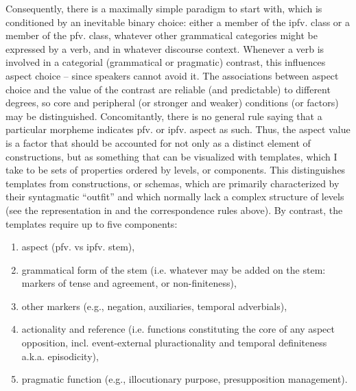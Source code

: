 \documentclass[output=paper]{langscibook}
\begin{document}
Consequently, there is a maximally simple paradigm to start with, which is conditioned by an inevitable binary choice: either a member of the ipfv. class or a member of the pfv. class, whatever other grammatical categories might be expressed by a verb, and in whatever discourse context. Whenever a verb is involved in a categorial (grammatical or pragmatic) contrast, this influences aspect choice – since speakers cannot avoid it. The associations between aspect choice and the value of the contrast are reliable (and predictable) to different degrees, so core and peripheral (or stronger and weaker) conditions (or factors) may be distinguished. Concomitantly, there is no general rule saying that a particular morpheme indicates pfv. or ipfv. aspect as such. Thus, the aspect value is a factor that should be accounted for not only as a distinct element of constructions, but as something that can be visualized with templates, which I take to be sets of properties ordered by levels, or components. This distinguishes templates from constructions, or schemas, which are primarily characterized by their syntagmatic “outfit” and which normally lack a complex structure of levels (see the representation in  and the correspondence rules above). By contrast, the templates require up to five components:

\begin{enumerate}[label=(\roman*)]
    \item aspect (pfv. vs ipfv. stem),
    \item grammatical form of the stem (i.e. whatever may be added on the stem: markers of tense and agreement, or non-finiteness),
    \item other markers (e.g., negation, auxiliaries, temporal adverbials),
    \item actionality and reference (i.e. functions constituting the core of any aspect opposition, incl. event-external pluractionality and temporal definiteness a.k.a. episodicity),
    \item pragmatic function (e.g., illocutionary purpose, presupposition management).
\end{enumerate}
\end{document}
